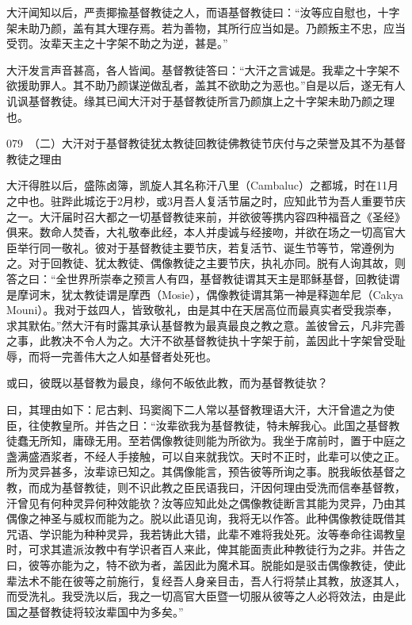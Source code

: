 \documentclass[12pt,UTF8]{ctexbook}
\begin{document}
大汗闻知以后，严责揶揄基督教徒之人，而语基督教徒曰：“汝等应自慰也，十字架未助乃颜，盖有其大理存焉。若为善物，其所行应当如是。乃颜叛主不忠，应当受罚。汝辈天主之十字架不助之为逆，甚是。”

大汗发言声音甚高，各人皆闻。基督教徒答曰：“大汗之言诚是。我辈之十字架不欲援助罪人。其不助乃颜谋逆做乱者，盖其不欲助之为恶也。”自是以后，遂无有人讥讽基督教徒。缘其已闻大汗对于基督教徒所言乃颜旗上之十字架未助乃颜之理也。





079　（二）大汗对于基督教徒犹太教徒回教徒佛教徒节庆付与之荣誉及其不为基督教徒之理由

大汗得胜以后，盛陈卤簿，凯旋人其名称汗八里（Cambaluc）之都城，时在11月之中也。驻跸此城讫于2月杪，或3月吾人复活节届之时，应知此节为吾人重要节庆之一。大汗届时召大都之一切基督教徒来前，并欲彼等携内容四种福音之《圣经》俱来。数命人焚香，大礼敬奉此经，本人并虔诚与经接吻，并欲在场之一切高官大臣举行同一敬礼。彼对于基督教徒主要节庆，若复活节、诞生节等节，常遵例为之。对于回教徒、犹太教徒、偶像教徒之主要节庆，执礼亦同。脱有人询其故，则答之曰：“全世界所崇奉之预言人有四，基督教徒谓其天主是耶稣基督，回教徒谓是摩诃末，犹太教徒谓是摩西（Mosie），偶像教徒谓其第一神是释迦牟尼（Cakya Mouni）。我对于兹四人，皆致敬礼，由是其中在天居高位而最真实者受我崇奉，求其默佑。”然大汗有时露其承认基督教为最真最良之教之意。盖彼曾云，凡非完善之事，此教决不令人为之。大汗不欲基督教徒执十字架于前，盖因此十字架曾受耻辱，而将一完善伟大之人如基督者处死也。

或曰，彼既以基督教为最良，缘何不皈依此教，而为基督教徒欤？

曰，其理由如下：尼古剌、玛窦阁下二人常以基督教理语大汗，大汗曾遣之为使臣，往使教皇所。并告之日：“汝辈欲我为基督教徒，特未解我心。此国之基督教徒蠢无所知，庸碌无用。至若偶像教徒则能为所欲为。我坐于席前时，置于中庭之盏满盛酒浆者，不经人手接触，可以自来就我饮。天时不正时，此辈可以使之正。所为灵异甚多，汝辈谅已知之。其偶像能言，预告彼等所询之事。脱我皈依基督之教，而成为基督教徒，则不识此教之臣民语我曰，汗因何理由受洗而信奉基督教，汗曾见有何种灵异何种效能欤？汝等应知此处之偶像教徒断言其能为灵异，乃由其偶像之神圣与威权而能为之。脱以此语见询，我将无以作答。此种偶像教徒既借其咒语、学识能为种种灵异，我若铸此大错，此辈不难将我处死。汝等奉命往谒教皇时，可求其遣派汝教中有学识者百人来此，俾其能面责此种教徒行为之非。并告之曰，彼等亦能为之，特不欲为者，盖因此为魔术耳。脱能如是驳击偶像教徒，使此辈法术不能在彼等之前施行，复经吾人身亲目击，吾人行将禁止其教，放逐其人，而受洗礼。我受洗以后，我之一切高官大臣暨一切服从彼等之人必将效法，由是此国之基督教徒将较汝辈国中为多矣。”
\end{document}
